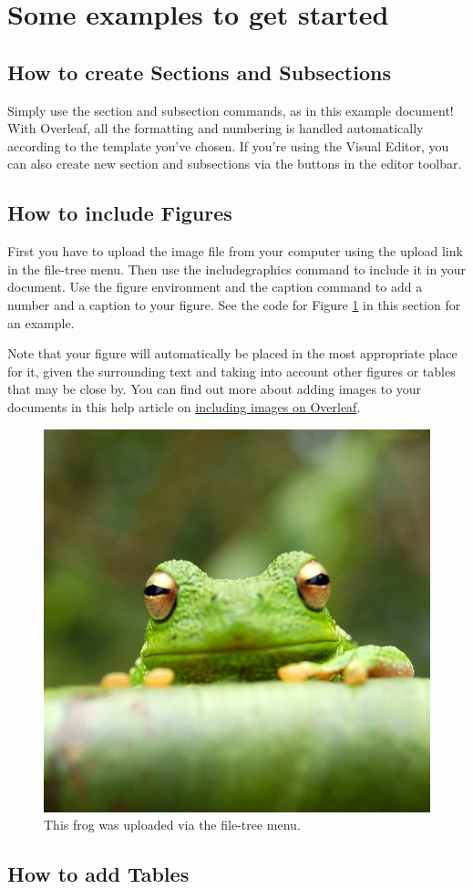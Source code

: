 \documentclass[twocolumn]{ltjsarticle}
\begin{document}
\section{Some examples to get started}

	\subsection{How to create Sections and Subsections}

		Simply use the section and subsection commands, as in this example document! With Overleaf, all the formatting and numbering is handled automatically according to the template you've chosen. If you're using the Visual Editor, you can also create new section and subsections via the buttons in the editor toolbar.

	\subsection{How to include Figures}

		First you have to upload the image file from your computer using the upload link in the file-tree menu. Then use the includegraphics command to include it in your document. Use the figure environment and the caption command to add a number and a caption to your figure. See the code for Figure \ref{fig:frog} in this section for an example.

		Note that your figure will automatically be placed in the most appropriate place for it, given the surrounding text and taking into account other figures or tables that may be close by. You can find out more about adding images to your documents in this help article on \href{https://www.overleaf.com/learn/how-to/Including_images_on_Overleaf}{including images on Overleaf}.

		\begin{figure}
			\centering
			\includegraphics[width=0.25\linewidth]{frog.jpg}
			\caption{\label{fig:frog}This frog was uploaded via the file-tree menu.}
		\end{figure}

	\subsection{How to add Tables}
\end{document}
